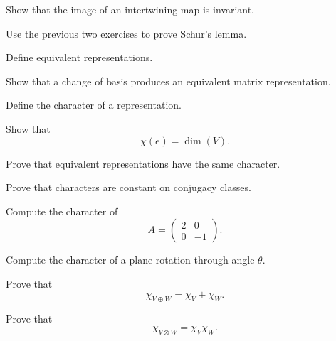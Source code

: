 \begin{exercise}[2]
Show that the image of an intertwining map is invariant.
\end{exercise}

\begin{exercise}[2]
Use the previous two exercises to prove Schur's lemma.
\end{exercise}

\begin{exercise}[1]
Define equivalent representations.
\end{exercise}

\begin{exercise}[2]
Show that a change of basis produces an equivalent matrix representation.
\end{exercise}

\begin{exercise}[1]
Define the character of a representation.
\end{exercise}

\begin{exercise}[1]
Show that
\[ \chi(e)=\dim(V). \]
\end{exercise}

\begin{exercise}[2]
Prove that equivalent representations have the same character.
\end{exercise}

\begin{exercise}[2]
Prove that characters are constant on conjugacy classes.
\end{exercise}

\begin{exercise}[1]
Compute the character of
\[ A=\begin{pmatrix}2&0\\0&-1\end{pmatrix}. \]
\end{exercise}

\begin{exercise}[1]
Compute the character of a plane rotation through angle \(\theta\).
\end{exercise}

\begin{exercise}[2]
Prove that
\[ \chi_{V\oplus W}=\chi_V+\chi_W. \]
\end{exercise}

\begin{exercise}[2]
Prove that
\[ \chi_{V\otimes W}=\chi_V\chi_W. \]
\end{exercise}

